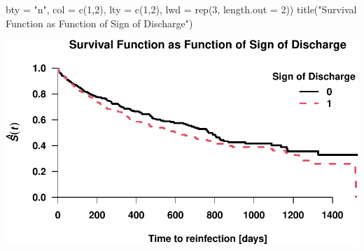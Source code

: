 \documentclass[
]{article}
\newenvironment{Shaded}{\begin{snugshade}}{\end{snugshade}}
\newcommand{\AttributeTok}[1]{\textcolor[rgb]{0.77,0.63,0.00}{#1}}
\newcommand{\DecValTok}[1]{\textcolor[rgb]{0.00,0.00,0.81}{#1}}
\newcommand{\FunctionTok}[1]{\textcolor[rgb]{0.00,0.00,0.00}{#1}}
\newcommand{\NormalTok}[1]{#1}
\newcommand{\StringTok}[1]{\textcolor[rgb]{0.31,0.60,0.02}{#1}}
\begin{document}
\begin{Shaded}
\begin{Highlighting}[]
       \AttributeTok{bty =} \StringTok{"n"}\NormalTok{, }\AttributeTok{col =} \FunctionTok{c}\NormalTok{(}\DecValTok{1}\NormalTok{,}\DecValTok{2}\NormalTok{), }\AttributeTok{lty =} \FunctionTok{c}\NormalTok{(}\DecValTok{1}\NormalTok{,}\DecValTok{2}\NormalTok{), }\AttributeTok{lwd =} \FunctionTok{rep}\NormalTok{(}\DecValTok{3}\NormalTok{, }\AttributeTok{length.out =} \DecValTok{2}\NormalTok{))}
\FunctionTok{title}\NormalTok{(}\StringTok{"Survival Function as Function of Sign of Discharge"}\NormalTok{)}
\end{Highlighting}
\end{Shaded}

\includegraphics{practical_files/figure-latex/unnamed-chunk-10-1.pdf}
\end{document}
